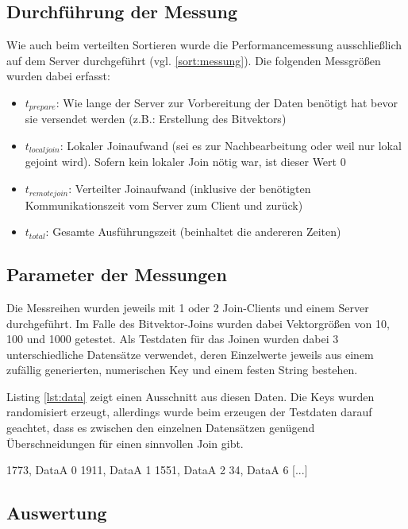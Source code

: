 \documentclass[fontsize=12pt,a4paper,headinclude=no,headings=small]{scrartcl}
\begin{document}
\subsection{Durchführung der Messung}
Wie auch beim verteilten Sortieren wurde die Performancemessung ausschließlich auf dem Server durchgeführt (vgl. \ref{sort:messung}). Die folgenden Messgrößen wurden dabei erfasst:
\begin{itemize}
  \item $t_{prepare}$: Wie lange der Server zur Vorbereitung der Daten benötigt hat bevor sie versendet werden (z.B.: Erstellung des Bitvektors)
  \item $t_{localjoin}$: Lokaler Joinaufwand (sei es zur Nachbearbeitung oder weil nur lokal gejoint wird). Sofern kein lokaler Join nötig war, ist dieser Wert 0
  \item $t_{remotejoin}$: Verteilter Joinaufwand (inklusive der benötigten Kommunikationszeit vom Server zum Client und zurück)
  \item $t_{total}$: Gesamte Ausführungszeit (beinhaltet die andereren Zeiten)
\end{itemize}

\subsection{Parameter der Messungen}
Die Messreihen wurden jeweils mit 1 oder 2 Join-Clients und einem Server durchgeführt. Im Falle des Bitvektor-Joins wurden dabei Vektorgrößen von 10, 100 und 1000 getestet. Als Testdaten für das Joinen wurden dabei 3 unterschiedliche Datensätze verwendet, deren Einzelwerte jeweils aus einem zufällig generierten, numerischen Key und einem festen String bestehen.

Listing \ref{lst:data} zeigt einen Ausschnitt aus diesen Daten. Die Keys wurden randomisiert erzeugt, allerdings wurde beim erzeugen der Testdaten darauf geachtet, dass es zwischen den einzelnen Datensätzen genügend Überschneidungen für einen sinnvollen Join gibt. 

\begin{code}[label=lst:data,frame=tblr,caption=Auszug aus den Join-Testdaten]
1773, DataA 0
1911, DataA 1
1551, DataA 2
34, DataA 6
[...]
\end{code}

\subsection{Auswertung}
\end{document}
